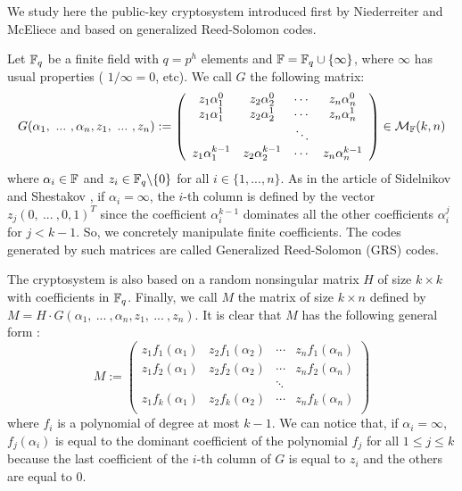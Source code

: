 \documentclass[a4paper]{article}
\begin{document}
We study here the public-key cryptosystem introduced first by Niederreiter and McEliece \cite{NiederH86} and based on generalized Reed-Solomon codes.

Let $\mathbb{F}_q$ be a finite field with $q = p^h$ elements and $\mathbb{F} = \mathbb{F}_q \cup \{ \infty \}$, where $\infty$ has usual properties ( $1/\infty = 0$, etc). We call $G$ the following matrix:
$$ G(\alpha_1, \ ... \ , \alpha_n, z_1, \ ... \ , z_n) := \left(
\begin{array}{cccc}
z_1 \alpha_1^0 &  z_2 \alpha_2^0 & \cdots & z_n \alpha_n^0 \\
z_1 \alpha_1^1 &  z_2 \alpha_2^1 & \cdots & z_n \alpha_n^1 \\
 & & \ddots & \\
z_1 \alpha_1^{k-1} &  z_2 \alpha_2^{k-1} & \cdots & z_n \alpha_n^{k-1}
\end{array}
\right) \in \mathcal{M}_{\mathbb{F}}(k,n) $$
where $\alpha_i \in \mathbb{F}$ and $z_i \in \mathbb{F}_q\backslash\{0\}$ for all $i \in \{1,...,n\}$.
As in the article of Sidelnikov and Shestakov \cite{SidelShes92}, if $\alpha_i=\infty$, the $i$-th column is defined by the vector $z_j(0, \ ... \ , 0,1)^{T}$ since the coefficient $\alpha_i^{k-1}$ dominates all the other coefficients $\alpha_i^{j}$ for $j<k-1$.
So, we concretely manipulate finite coefficients. The codes generated by such matrices are called Generalized Reed-Solomon (GRS) codes.

The cryptosystem is also based on a random nonsingular matrix $H$ of size $k\times k$ with coefficients in $\mathbb{F}_q$. Finally, we call $M$ the matrix of size $k\times n$ defined by $M=H\cdot G(\alpha_1, \ ... \ , \alpha_n, z_1, \ ... \ , z_n)$.
It is clear that $M$ has the following general form :
$$ M := \left(
\begin{array}{cccc}
z_1f_1(\alpha_1) &  z_2f_1(\alpha_2) & \cdots & z_nf_1(\alpha_n) \\
z_1f_2(\alpha_1) &  z_2f_2(\alpha_2) & \cdots & z_nf_2(\alpha_n) \\
 & & \ddots & \\
z_1f_k(\alpha_1) &  z_2f_k(\alpha_2) & \cdots & z_nf_k(\alpha_n) \\
\end{array}
\right)$$
where $f_i$ is a polynomial of degree at most $k-1$.
We can notice that, if $\alpha_i = \infty$, $f_j(\alpha_i)$ is equal to the dominant coefficient of the polynomial $f_j$ for all $1\leq j\leq k$ because the last coefficient of the $i$-th column of $G$ is equal to $z_i$ and the others are equal to $0$.
\end{document}
